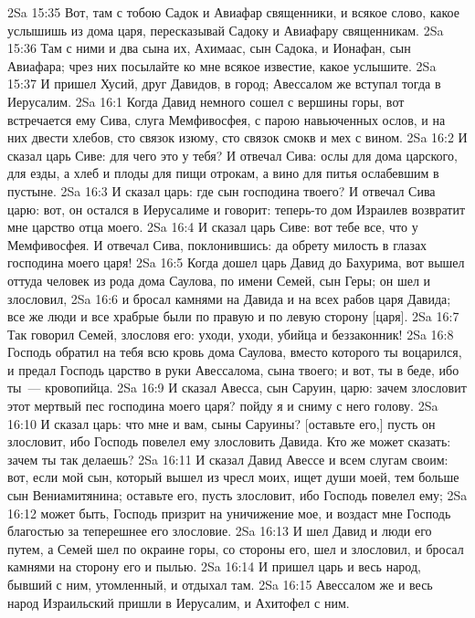 \vs 2Sa 15:35 Вот, там с тобою Садок и Авиафар священники, и всякое слово, какое услышишь из дома царя, пересказывай Садоку и Авиафару священникам.
\vs 2Sa 15:36 Там с ними и два сына их, Ахимаас, сын Садока, и Ионафан, сын Авиафара; чрез них посылайте ко мне всякое известие, какое услышите.
\vs 2Sa 15:37 И пришел Хусий, друг Давидов, в город; Авессалом же вступал тогда в Иерусалим.
\vs 2Sa 16:1 Когда Давид немного сошел с вершины горы, вот встречается ему Сива, слуга Мемфивосфея, с парою навьюченных ослов, и на них двести хлебов, сто связок изюму, сто связок смокв и мех с вином.
\vs 2Sa 16:2 И сказал царь Сиве: для чего это у тебя? И отвечал Сива: ослы для дома царского, для езды, а хлеб и плоды для пищи отрокам, а вино для питья ослабевшим в пустыне.
\vs 2Sa 16:3 И сказал царь: где сын господина твоего? И отвечал Сива царю: вот, он остался в Иерусалиме и говорит: теперь-то дом Израилев возвратит мне царство отца моего.
\vs 2Sa 16:4 И сказал царь Сиве: вот тебе все, что у Мемфивосфея. И отвечал Сива, поклонившись: да обрету милость в глазах господина моего царя!
\vs 2Sa 16:5 Когда дошел царь Давид до Бахурима, вот вышел оттуда человек из рода дома Саулова, по имени Семей, сын Геры; он шел и злословил,
\vs 2Sa 16:6 и бросал камнями на Давида и на всех рабов царя Давида; все же люди и все храбрые были по правую и по левую сторону [царя].
\vs 2Sa 16:7 Так говорил Семей, злословя его: уходи, уходи, убийца и беззаконник!
\vs 2Sa 16:8 Господь обратил на тебя всю кровь дома Саулова, вместо которого ты воцарился, и предал Господь царство в руки Авессалома, сына твоего; и вот, ты в беде, ибо ты~--- кровопийца.
\vs 2Sa 16:9 И сказал Авесса, сын Саруин, царю: зачем злословит этот мертвый пес господина моего царя? пойду я и сниму с него голову.
\vs 2Sa 16:10 И сказал царь: что мне и вам, сыны Саруины? [оставьте его,] пусть он злословит, ибо Господь повелел ему злословить Давида. Кто же может сказать: зачем ты так делаешь?
\vs 2Sa 16:11 И сказал Давид Авессе и всем слугам своим: вот, если мой сын, который вышел из чресл моих, ищет души моей, тем больше сын Вениамитянина; оставьте его, пусть злословит, ибо Господь повелел ему;
\vs 2Sa 16:12 может быть, Господь призрит на уничижение мое, и воздаст мне Господь благостью за теперешнее его злословие.
\vs 2Sa 16:13 И шел Давид и люди его  путем, а Семей шел по окраине горы, со стороны его, шел и злословил, и бросал камнями на сторону его и пылью.
\vs 2Sa 16:14 И пришел царь и весь народ, бывший с ним, утомленный, и отдыхал там.
\rsbpar\vs 2Sa 16:15 Авессалом же и весь народ Израильский пришли в Иерусалим, и Ахитофел с ним.
